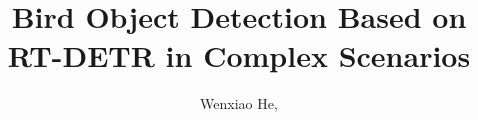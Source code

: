 \documentclass[journal]{IEEEtran}
\begin{document}
    \title{Bird Object Detection Based on RT-DETR in Complex Scenarios}
    \author{Wenxiao He,}
    \maketitle
    
    
    
    \printbibliography
\end{document}
